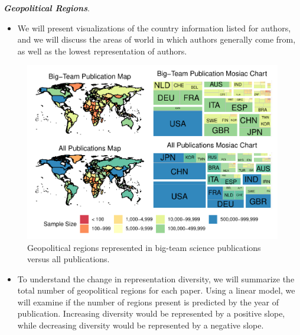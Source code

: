 \documentclass[
  man]{apa7}
\providecommand{\tightlist}{%
  \setlength{\itemsep}{0pt}\setlength{\parskip}{0pt}}
\begin{document}
\textbf{\emph{Geopolitical Regions}}.

\begin{itemize}
\tightlist
\item
  We will present visualizations of the country information listed for
  authors, and we will discuss the areas of world in which authors
  generally come from, as well as the lowest representation of
  authors.
\end{itemize}

\begin{figure}
\centering
\includegraphics{manuscript_scopus_files/figure-latex/fig-map-both-1.pdf}
\caption{\label{fig:fig-map-both}Geopolitical regions represented in big-team science publications versus all publications.}
\end{figure}

\begin{itemize}
\tightlist
\item
  To understand the change in representation diversity, we will
  summarize the total number of geopolitical regions for each paper.
  Using a linear model, we will examine if the number of regions
  present is predicted by the year of publication. Increasing
  diversity would be represented by a positive slope, while decreasing
  diversity would be represented by a negative slope.
\end{itemize}
\end{document}
